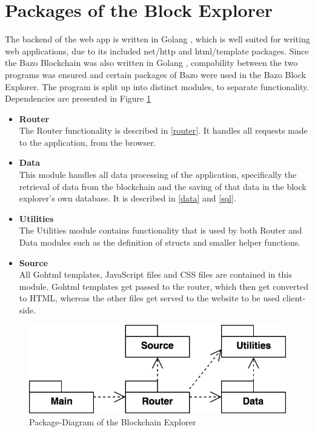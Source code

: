 \section{Packages of the Block Explorer}
The backend of the web app is written in Golang \cite{golang}, which is well suited for writing web applications, due to its included net/http \cite{httppackage} and html/template \cite{template} packages. Since the Bazo Blockchain was also written in Golang \cite{bazo}, compability between the two programs was ensured and certain packages of Bazo were used in the Bazo Block Explorer. The program is split up into distinct modules, to separate functionality. Dependencies are presented in Figure \ref{fig:packages} 

\begin{itemize}
\item \textbf{Router}\\
The Router functionality is described in \ref{router}. It handles all requests made to the application, from the browser.
\item \textbf{Data}\\
This module handles all data processing of the application, specifically the retrieval of data from the blockchain and the saving of that data in the block explorer's own database. It is described in \ref{data} and \ref{sql}.
\item \textbf{Utilities}\\
The Utilities module contains functionality that is used by both Router and Data modules such as the definition of structs and smaller helper functions.
\item \textbf{Source}\\
All Gohtml templates, JavaScript files and CSS files are contained in this module. Gohtml templates get passed to the router, which then get converted to HTML, whereas the other files get served to the website to be used client-side.
\end{itemize}

\begin{figure}
  \includegraphics[scale=0.35]{packages.png}
  \centering
  \caption{Package-Diagram of the Blockchain Explorer}
  \label{fig:packages}
\end{figure}

